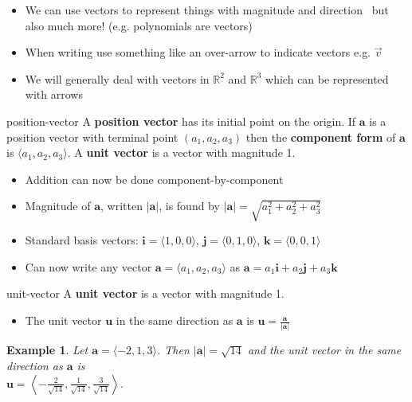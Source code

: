 \documentclass[letterpaper, 11pt, openany]{book}
\theoremstyle{mytheoremstyle}
\theoremstyle{myexamplestyle}
\newtheorem{example}{Example}[section]
\begin{document}
\begin{itemize}
    \item We can use vectors to represent things with magnitude and direction \faMeh \ but also much more! (e.g. polynomials are vectors)
    \item[{\faExclamationTriangle[solid]}] When writing use something like an over-arrow to indicate vectors e.g. $\vec{v}$
    \item We will generally deal with vectors in $\mathbb{R}^{2}$ and $\mathbb{R}^{3}$ which can be represented with arrows 
\end{itemize}


\begin{definition}{}{position-vector}
    A \textbf{position vector} has its initial point on the origin. If $\mathbf{a}$ is a position vector with terminal point $(a_{1}, a_{2}, a_{3})$ then the \textbf{component form} of $\mathbf{a}$ is $\langle a_{1}, a_{2}, a_{3} \rangle$. A \textbf{unit vector} is a vector with magnitude 1.
\end{definition}

\begin{itemize}
    \item Addition can now be done component-by-component
    \item Magnitude of $\mathbf{a}$, written $|\mathbf{a}|$, is found by $|\mathbf{a}| = \sqrt{a_{1}^{2} + a_{2}^{2} + a_{3}^{2}}$
    \item Standard basis vectors: $\mathbf{i} = \langle 1, 0, 0 \rangle$, $\mathbf{j} = \langle 0, 1, 0 \rangle$, $\mathbf{k} = \langle 0, 0, 1 \rangle$
    \item Can now write any vector $\mathbf{a} = \langle a_{1}, a_{2}, a_{3} \rangle$ as $\mathbf{a} = a_{1}\mathbf{i} + a_{2}\mathbf{j} + a_{3}\mathbf{k}$
\end{itemize}

\begin{definition}{}{unit-vector}
    A \textbf{unit vector} is a vector with magnitude 1.
\end{definition}

\begin{itemize}
    \item The unit vector $\mathbf{u}$ in the same direction as $\mathbf{a}$ is $\displaystyle \mathbf{u} = \frac{\mathbf{a}}{|\mathbf{a}|}$
\end{itemize}

\begin{example}\label{e:vectors-unit-vector}
    Let $\mathbf{a} = \langle -2, 1, 3 \rangle$. Then $|\mathbf{a}| = \sqrt{14}$ and the unit vector in the same direction as $\displaystyle \mathbf{a}$ is \\ $\mathbf{u} = \left\langle -\frac{2}{\sqrt{14}}, \frac{1}{\sqrt{14}},  \frac{3}{\sqrt{14}}\right\rangle$. 
\end{example}
\end{document}
